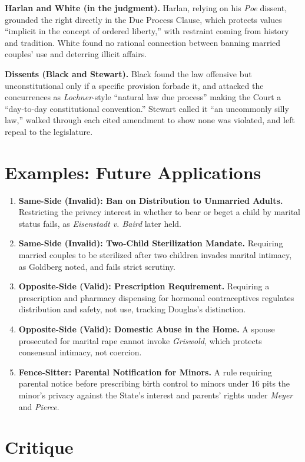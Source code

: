 \documentclass[12pt]{article}
\begin{document}
\textbf{Harlan and White (in the judgment).} Harlan, relying on his \textit{Poe} dissent, grounded the right directly in the Due Process Clause, which protects values ``implicit in the concept of ordered liberty,'' with restraint coming from history and tradition. White found no rational connection between banning married couples' use and deterring illicit affairs.

\textbf{Dissents (Black and Stewart).} Black found the law offensive but unconstitutional only if a specific provision forbade it, and attacked the concurrences as \textit{Lochner}-style ``natural law due process'' making the Court a ``day-to-day constitutional convention.'' Stewart called it ``an uncommonly silly law,'' walked through each cited amendment to show none was violated, and left repeal to the legislature.

\section{Examples: Future Applications}

\begin{enumerate}
\item \textbf{Same-Side (Invalid): Ban on Distribution to Unmarried Adults.} Restricting the privacy interest in whether to bear or beget a child by marital status fails, as \textit{Eisenstadt v. Baird} later held.
\item \textbf{Same-Side (Invalid): Two-Child Sterilization Mandate.} Requiring married couples to be sterilized after two children invades marital intimacy, as Goldberg noted, and fails strict scrutiny.
\item \textbf{Opposite-Side (Valid): Prescription Requirement.} Requiring a prescription and pharmacy dispensing for hormonal contraceptives regulates distribution and safety, not use, tracking Douglas's distinction.
\item \textbf{Opposite-Side (Valid): Domestic Abuse in the Home.} A spouse prosecuted for marital rape cannot invoke \textit{Griswold}, which protects consensual intimacy, not coercion.
\item \textbf{Fence-Sitter: Parental Notification for Minors.} A rule requiring parental notice before prescribing birth control to minors under 16 pits the minor's privacy against the State's interest and parents' rights under \textit{Meyer} and \textit{Pierce}.
\end{enumerate}

\section{Critique}
\end{document}

